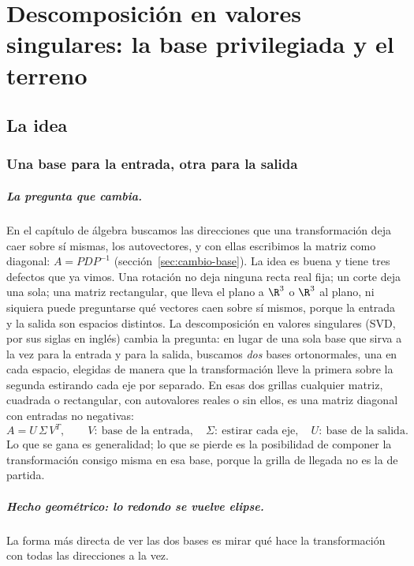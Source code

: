 \chapter{Descomposición en valores singulares: la base privilegiada y el terreno}\label{cap:09}

\section{La idea}

\subsection{Una base para la entrada, otra para la salida}\label{sec:svd-idea}

\paragraph{La pregunta que cambia.} En el capítulo de álgebra buscamos las direcciones que
una transformación deja caer sobre sí mismas, los autovectores, y con ellas escribimos la
matriz como diagonal: \(A=PDP^{-1}\) (sección~\ref{sec:cambio-base}). La idea es buena y
tiene tres defectos que ya vimos. Una rotación no deja ninguna recta real fija; un corte deja
una sola; una matriz rectangular, que lleva el plano a \(\R^3\) o \(\R^3\) al plano, ni
siquiera puede preguntarse qué vectores caen sobre sí mismos, porque la entrada y la salida
son espacios distintos. La descomposición en valores singulares (SVD, por sus siglas en
inglés) cambia la pregunta: en lugar de una sola base que sirva a la vez para la entrada y
para la salida, buscamos \emph{dos} bases ortonormales, una en cada espacio, elegidas de
manera que la transformación lleve la primera sobre la segunda estirando cada eje por
separado. En esas dos grillas cualquier matriz, cuadrada o rectangular, con autovalores
reales o sin ellos, es una matriz diagonal con entradas no negativas:
\[
  A=U\,\Sigma\,V^T,\qquad
  V:\ \text{base de la entrada},\quad
  \Sigma:\ \text{estirar cada eje},\quad
  U:\ \text{base de la salida}.
\]
Lo que se gana es generalidad; lo que se pierde es la posibilidad de componer la
transformación consigo misma en esa base, porque la grilla de llegada no es la de partida.

\paragraph{Hecho geométrico: lo redondo se vuelve elipse.} La forma más directa de ver las
dos bases es mirar qué hace la transformación con todas las direcciones a la vez.

